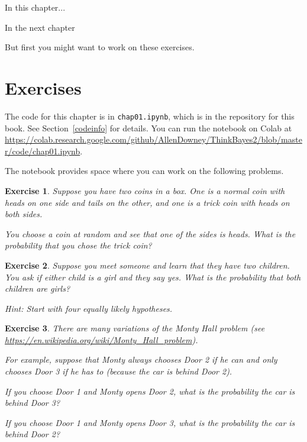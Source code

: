 \documentclass[12pt]{book}
\theoremstyle{exercise}
\newtheorem{exercise}{Exercise}[chapter]
\begin{document}
In this chapter...

In the next chapter

But first you might want to work on these exercises.


\section{Exercises}

The code for this chapter is in {\tt chap01.ipynb}, which is in the repository for this book.  See Section~\ref{codeinfo} for details.
You can run the notebook on Colab at \url{https://colab.research.google.com/github/AllenDowney/ThinkBayes2/blob/master/code/chap01.ipynb}.

The notebook provides space where you can work on the following problems.

\begin{exercise}

Suppose you have two coins in a box.
One is a normal coin with heads on one side and tails on the other, and one is a trick coin with heads on both sides.

You choose a coin at random and see that one of the sides is heads.
What is the probability that you chose the trick coin?

\end{exercise}


\begin{exercise}

Suppose you meet someone and learn that they have two children.
You ask if either child is a girl and they say yes.
What is the probability that both children are girls?

Hint: Start with four equally likely hypotheses.

\end{exercise}


\begin{exercise}

There are many variations of the Monty Hall problem (see \url{https://en.wikipedia.org/wiki/Monty_Hall_problem}).  

For example, suppose that Monty always chooses Door 2 if he can and
only chooses Door 3 if he has to (because the car is behind Door 2).

If you choose Door 1 and Monty opens Door 2, what is the probability the car is behind Door 3?

If you choose Door 1 and Monty opens Door 3, what is the probability the car is behind Door 2?

\end{exercise}
\end{document}
